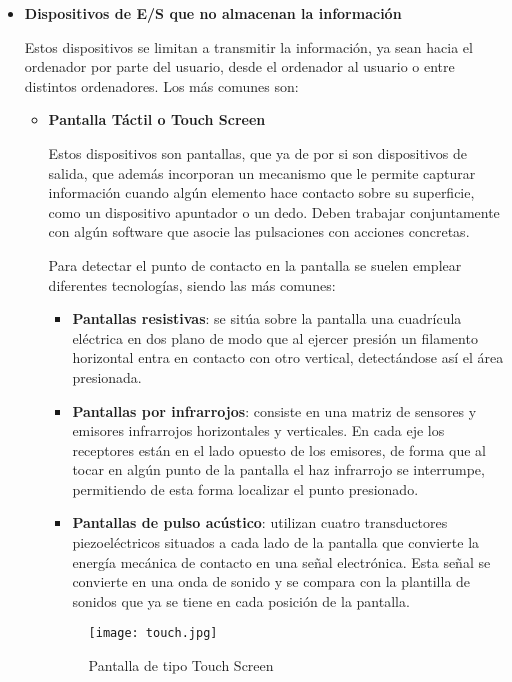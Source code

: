 \begin{itemize}
    \item \textbf{Dispositivos de E/S que no almacenan la información}

    Estos dispositivos se limitan a transmitir la información, ya sean hacia el ordenador por parte del usuario, desde el ordenador al usuario o entre distintos ordenadores. Los más comunes son:

    \begin{itemize}
        \item \textbf{Pantalla Táctil o Touch Screen}

        Estos dispositivos son pantallas, que ya de por si son dispositivos de salida, que además incorporan un mecanismo que le permite capturar información cuando algún elemento hace contacto sobre su superficie, como un dispositivo apuntador o un dedo. Deben trabajar conjuntamente con algún software que asocie las pulsaciones con acciones concretas.

        Para detectar el punto de contacto en la pantalla se suelen emplear diferentes tecnologías, siendo las más comunes:

        \begin{itemize}
            \item \textbf{Pantallas resistivas}: se sitúa sobre la pantalla una cuadrícula eléctrica en dos plano de modo que al ejercer presión un filamento horizontal entra en contacto con otro vertical, detectándose así el área presionada.
            \item \textbf{Pantallas por infrarrojos}: consiste en una matriz de sensores y emisores infrarrojos horizontales y verticales. En cada eje los receptores están en el lado opuesto de los emisores, de forma que al tocar en algún punto de la pantalla el haz infrarrojo se interrumpe, permitiendo de esta forma localizar el punto presionado.
            \item \textbf{Pantallas de pulso acústico}: utilizan cuatro transductores piezoeléctricos situados a cada lado de la pantalla que convierte la energía mecánica de contacto en una señal electrónica. Esta señal se convierte en una onda de sonido y se compara con la plantilla de sonidos que ya se tiene en cada posición de la pantalla.
        \end{itemize}

        \begin{figure}[ht]
            \centering
            \texttt{[image: touch.jpg]}
            \caption{Pantalla de tipo Touch Screen}
        \end{figure}


\end{itemize}
\end{itemize}
